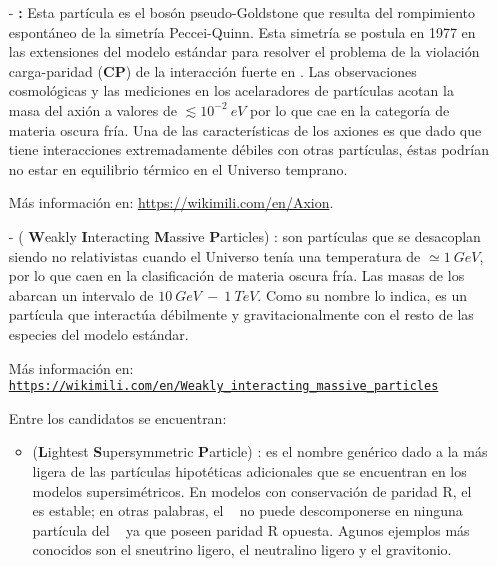 \begin{itemize}
\item[-] \textbf{\Axiones :} Esta partícula es el bosón pseudo-Goldstone que resulta del rompimiento espontáneo de la simetría Peccei-Quinn. Esta simetría se postula en 1977 en las extensiones del modelo estándar para resolver el problema de la violación carga-paridad (\textbf{CP}) de la interacción fuerte en \QCD. Las observaciones cosmológicas y las mediciones en los acelaradores de partículas acotan la masa del axión a valores de $\lesssim 10^{-2}~eV$ por lo que cae en la categoría de materia oscura fría. Una de las características de los axiones es que dado que tiene interacciones extremadamente débiles con otras partículas, éstas podrían no estar en equilibrio térmico en el Universo temprano. 

Más información en: \url{https://wikimili.com/en/Axion}.

\item[-] \WIMPs ( \textbf{W}eakly \textbf{I}nteracting \textbf{M}assive \textbf{P}articles) : son partículas que se desacoplan siendo no relativistas cuando el Universo tenía una temperatura de $\simeq 1~ GeV$, por lo que caen en la clasificación de materia oscura fría. Las masas
de los \WIMPs ~ abarcan un intervalo de $10 ~ GeV ~ - ~ 1 ~ TeV$. Como su nombre lo indica, es un partícula que interactúa débilmente y 
gravitacionalmente con el resto de las especies del modelo estándar. 

Más información en: \href{https://wikimili.com/en/Weakly_interacting_massive_particles}{\texttt{https://wikimili.com/en/Weakly\_interacting\_massive\_par\-ti\-cles}}

Entre los candidatos se encuentran:
\begin{itemize}
\item 	\LSP (\textbf{L}ightest \textbf{S}upersymmetric \textbf{P}article) : es el nombre genérico dado a la más ligera de las partículas hipotéticas adicionales que se encuentran en los modelos supersimétricos. En modelos con conservación de paridad R, el \LSP ~ es estable; en otras palabras, el \LSP ~ no puede descomponerse en ninguna partícula del \ME~ ya que poseen paridad R opuesta. Agunos ejemplos más conocidos son el sneutrino ligero, el neutralino ligero y el gravitonio.



\end{itemize}
\end{itemize}
